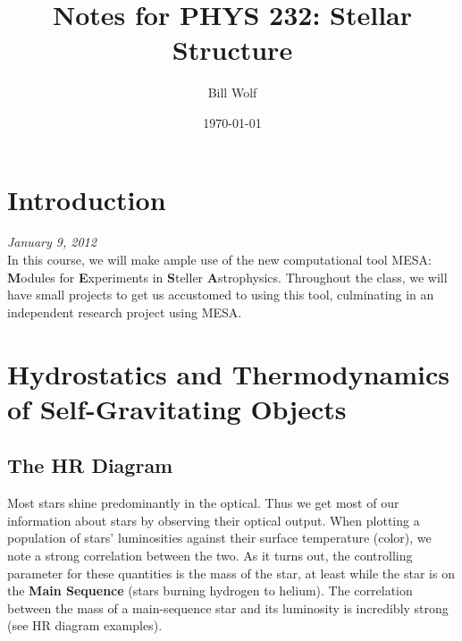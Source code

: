 \documentclass[10pt]{article}
\title{Notes for PHYS 232: Stellar Structure}
\author{Bill Wolf}
\date{\today}
\newcommand{\n}{\noindent}
\begin{document}
\vfill\maketitle\vfill \newpage

\tableofcontents \newpage


\section{Introduction}
	\emph{January 9, 2012}\\
	
	\n In this course, we will make ample use of the new computational tool MESA: \textbf{M}odules for \textbf{E}xperiments in \textbf{S}teller \textbf{A}strophysics. Throughout the class, we will have small projects to get us accustomed to using this tool, culminating in an independent research project using MESA.

\section{Hydrostatics and Thermodynamics of Self-Gravitating Objects}
	\subsection{The HR Diagram} 
	Most stars shine predominantly in the optical. Thus we get most of our information about stars by observing their optical output. When plotting a population of stars' luminosities against their surface temperature (color), we note a strong correlation between the two. As it turns out, the controlling parameter for these quantities is the mass of the star, at least while the star is on the \textbf{Main Sequence} (stars burning hydrogen to helium). The correlation between the mass of a main-sequence star and its luminosity is incredibly strong (see HR diagram examples).
\end{document}
